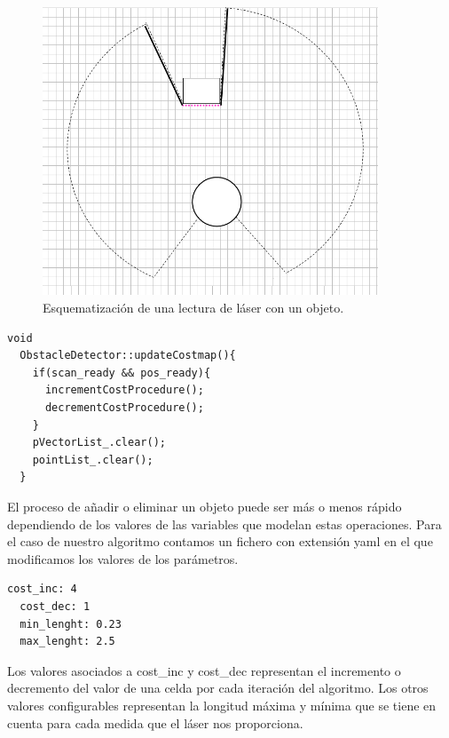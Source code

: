 \begin{figure} [H]
  \begin{center}
    \includegraphics[width=10cm]{img/cap5/lecturaLaser}
  \end{center}
  \caption{Esquematización de una lectura de láser con un objeto.}
  \label{fig:lecturalaser}
\end{figure}


\renewcommand{\lstlistingname}{Código}
\begin{lstlisting}[caption=Función que actualiza el mapa en cada iteración, label={lst:updatecostmap}]
  void
  ObstacleDetector::updateCostmap(){
    if(scan_ready && pos_ready){
      incrementCostProcedure();
      decrementCostProcedure();
    }
    pVectorList_.clear();
    pointList_.clear();
  }
\end{lstlisting}

El proceso de añadir o eliminar un objeto puede ser más o menos rápido dependiendo de los valores de las variables que modelan estas operaciones. Para el caso de nuestro algoritmo contamos un fichero con extensión yaml en el que modificamos los valores de los parámetros.
\renewcommand{\lstlistingname}{Código}
\begin{lstlisting}[caption=Fichero de configuración obstacle\_detector.yaml, label={lst:obstacledetectorconfig}]
  cost_inc: 4
  cost_dec: 1
  min_lenght: 0.23
  max_lenght: 2.5
\end{lstlisting}
Los valores asociados a cost\_inc y cost\_dec representan el incremento o decremento del valor de una celda por cada iteración del algoritmo. Los otros valores configurables representan la longitud máxima y mínima que se tiene en cuenta para cada medida que el láser nos proporciona.

